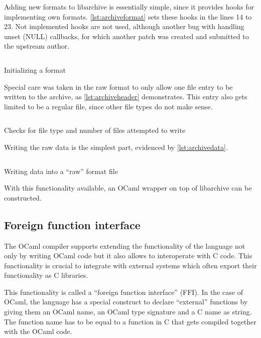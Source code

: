 \documentclass[parskip=half]{scrreprt}
\newcommand\inline[1]{{\addfontfeature{Letters=SmallCaps}#1}}
\begin{document}
Adding new formats to libarchive is essentially simple, since it provides hooks
for implementing own formats. \autoref{lst:archiveformat} sets these hooks in
the lines 14 to 23. Not implemented hooks are not used, although another bug
with handling unset (\inline{NULL}) callbacks, for which another patch was
created and submitted to the upstream author.

\begin{listing}[h]
  \inputminted[linenos,fontsize=\small]{c}{archive-set-format.c}
  \caption{Initializing a format}
  \label{lst:archiveformat}
\end{listing}

Special care was taken in the raw format to only allow one file entry to be
written to the archive, as \autoref{lst:archiveheader} demonstrates. This entry
also gets limited to be a regular file, since other file types do not make
sense.

\begin{listing}[h]
  \inputminted[linenos,fontsize=\small]{c}{archive-write-header.c}
  \caption{Checks for file type and number of files attempted to write}
  \label{lst:archiveheader}
\end{listing}

Writing the raw data is the simplest part, evidenced by
\autoref{lst:archivedata}.

\begin{listing}[h]
  \inputminted[linenos,fontsize=\small]{c}{archive-write-data.c}
  \caption{Writing data into a \enquote{raw} format file}
  \label{lst:archivedata}
\end{listing}

With this functionality available, an OCaml wrapper on top of libarchive can be
constructed.

\subsection{Foreign function interface}
\label{sec:ffi}

The OCaml compiler supports extending the functionality of the language not
only by writing OCaml code but it also allows to interoperate with C code. This
functionality is crucial to integrate with external systems which often export
their functionality as C libraries.

This functionality is called a \enquote{foreign function interface} (FFI). In
the case of OCaml, the language has a special construct to declare
\enquote{external} functions by giving them an OCaml name, an OCaml type
signature and a C name as string. The function name has to be equal to a
function in C that gets compiled together with the OCaml code.
\end{document}

